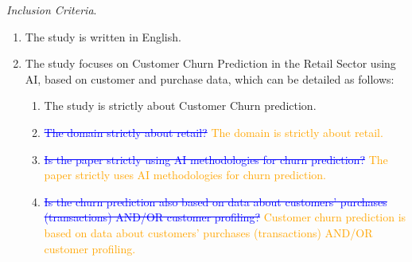 \documentclass[preprint,12pt]{elsarticle}
\begin{document}
\textit{Inclusion Criteria}. 
\begin{enumerate}[label=(IC\arabic*), leftmargin=19.5mm, itemsep=1pt, parsep=0pt]
\item The study is written in English.
\item The study focuses on Customer Churn Prediction in the Retail Sector using AI, based on customer and purchase data, which can be detailed as follows:
\begin{enumerate}[label=(IC2.\arabic*), leftmargin=19.5mm, itemsep=1pt, parsep=0pt]
\item The study is strictly about Customer Churn prediction.
\item \textcolor{blue}{\sout{The domain strictly about retail?}} \textcolor{orange}{The domain is strictly about retail.}
\item \textcolor{blue}{\sout{Is the paper strictly using AI methodologies for churn prediction?}} \textcolor{orange}{The paper strictly uses AI methodologies for churn prediction.}
\item \textcolor{blue}{\sout{Is the churn prediction also based on data about customers’ purchases (transactions) AND/OR customer profiling?}} \textcolor{orange}{Customer churn prediction is based on data about customers’ purchases (transactions) AND/OR customer profiling.}
\end{enumerate}
\end{enumerate}
\end{document}
